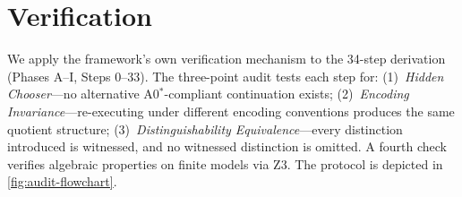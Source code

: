 
\section{Verification}
\label{sec:verification}

We apply the framework's own verification mechanism to the 34-step
derivation (Phases A--I, Steps 0--33).  The three-point audit tests each step for:
(1)~\emph{Hidden Chooser}---no alternative A0$^*$-compliant continuation exists;
(2)~\emph{Encoding Invariance}---re-executing under different encoding
conventions produces the same quotient structure;
(3)~\emph{Distinguishability Equivalence}---every distinction introduced is
witnessed, and no witnessed distinction is omitted.
A fourth check verifies algebraic properties on finite models via Z3.
The protocol is depicted in \cref{fig:audit-flowchart}.



